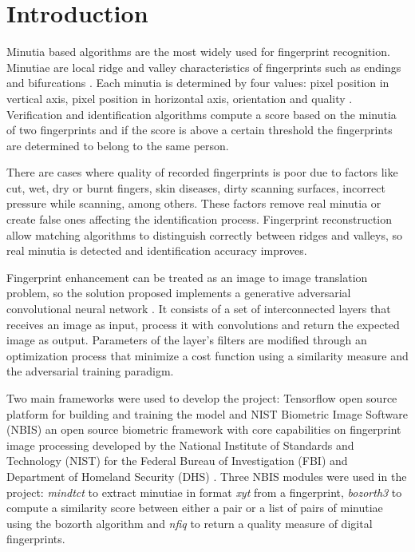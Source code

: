\documentclass[a4paper,fleqn]{cas-dc}
\begin{document}
\section{Introduction}

Minutia based algorithms are the most widely used for fingerprint recognition. Minutiae are local ridge and valley characteristics of fingerprints such as endings and bifurcations \cite{HFPR}. Each minutia is determined by four values: pixel position in vertical axis, pixel position in horizontal axis, orientation and quality \cite{NBISUG}. Verification and identification algorithms compute a score based on the minutia of two fingerprints and if the score is above a certain threshold the fingerprints are determined to belong to the same person.

There are cases where quality of recorded fingerprints is poor due to factors like cut, wet, dry or burnt fingers, skin diseases, dirty scanning surfaces, incorrect pressure while scanning, among others. These factors remove real minutia or create false ones affecting the identification process. Fingerprint reconstruction allow matching algorithms to distinguish correctly between ridges and valleys, so real minutia is detected and identification accuracy improves.

Fingerprint enhancement can be treated as an image to image translation problem, so the solution proposed implements a generative adversarial convolutional neural network \cite{ITITAN}. It consists of a set of interconnected layers that receives an image as input, process it with convolutions and return the expected image as output. Parameters of the layer's filters are modified through an optimization process that minimize a cost function using a similarity measure and the adversarial training paradigm. 

Two main frameworks were used to develop the project: Tensorflow open source platform for building and training the model and NIST Biometric Image Software (NBIS) an open source biometric framework with core capabilities on fingerprint image processing developed by the National Institute of Standards and Technology (NIST) for the Federal Bureau of Investigation (FBI) and Department of Homeland Security (DHS) \cite{NBISWP}. Three NBIS modules were used in the project: \textit{mindtct} to extract minutiae in format \textit{xyt} from a fingerprint, \textit{bozorth3} to compute a similarity score between either a pair or a list of pairs of minutiae using the bozorth algorithm and \textit{nfiq} to return a quality measure of digital fingerprints.
\end{document}
